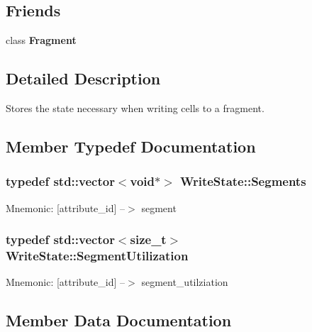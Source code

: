 \subsection*{Friends}
\begin{DoxyCompactItemize}
\item 
\hypertarget{structWriteState_adcaa892717dd216d80c530db7f8a7799}{}class {\bfseries Fragment}\label{structWriteState_adcaa892717dd216d80c530db7f8a7799}

\end{DoxyCompactItemize}


\subsection{Detailed Description}
Stores the state necessary when writing cells to a fragment. 

\subsection{Member Typedef Documentation}
\hypertarget{structWriteState_aad30b2ca76d7c514032911e74076cfc5}{}
\subsubsection[{Segments}]{\setlength{\rightskip}{0pt plus 5cm}typedef std\+::vector$<$void$\ast$$>$ {\bf Write\+State\+::\+Segments}}\label{structWriteState_aad30b2ca76d7c514032911e74076cfc5}
Mnemonic\+: \mbox{[}attribute\+\_\+id\mbox{]} --$>$ segment \hypertarget{structWriteState_ae2a9d7195188e68b68d0c33725cbf460}{}
\subsubsection[{Segment\+Utilization}]{\setlength{\rightskip}{0pt plus 5cm}typedef std\+::vector$<$size\+\_\+t$>$ {\bf Write\+State\+::\+Segment\+Utilization}}\label{structWriteState_ae2a9d7195188e68b68d0c33725cbf460}
Mnemonic\+: \mbox{[}attribute\+\_\+id\mbox{]} --$>$ segment\+\_\+utilziation 

\subsection{Member Data Documentation}
\hypertarget{structWriteState_a50b41a53268ae74bec6e24695624f9d0}{}
